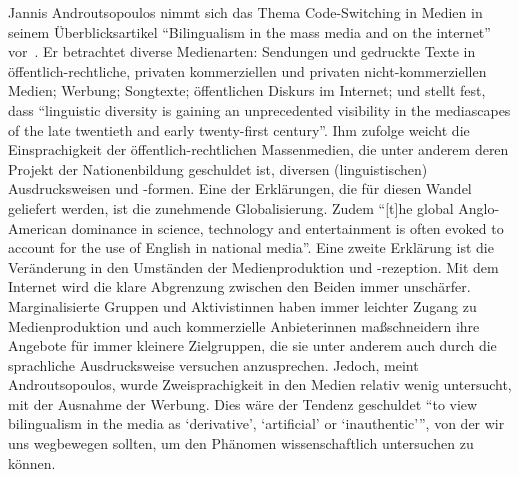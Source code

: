 Jannis Androutsopoulos nimmt sich das Thema Code-Switching in Medien in seinem Überblicksartikel ``Bilingualism in the mass media and on the internet'' vor~\cite[]{Andr07}.
Er betrachtet diverse Medienarten: Sendungen und gedruckte Texte in öffentlich-rechtliche, privaten kommerziellen und privaten nicht-kommerziellen Medien; Werbung; Songtexte; öffentlichen Diskurs im Internet;
und stellt fest, dass ``linguistic diversity is gaining an unprecedented visibility in the mediascapes of the late twentieth and early twenty-first century''.
Ihm zufolge weicht die Einsprachigkeit der öffentlich-rechtlichen Massenmedien, die unter anderem deren Projekt der Nationenbildung geschuldet ist, diversen (linguistischen) Ausdrucksweisen und -formen.
Eine der Erklärungen, die für diesen Wandel geliefert werden, ist die zunehmende Globalisierung.
Zudem ``[t]he global Anglo-American dominance in science, technology and entertainment is often evoked to account for the use of English in national media''.
Eine zweite Erklärung ist die Veränderung in den Umständen der Medienproduktion und -rezeption.
Mit dem Internet wird die klare Abgrenzung zwischen den Beiden immer unschärfer.
Marginalisierte Gruppen und Aktivistinnen haben immer leichter Zugang zu Medienproduktion und auch kommerzielle Anbieterinnen maßschneidern ihre Angebote für immer kleinere Zielgruppen, die sie unter anderem auch durch die sprachliche Ausdrucksweise versuchen anzusprechen.
Jedoch, meint Androutsopoulos, wurde Zweisprachigkeit in den Medien relativ wenig untersucht, mit der Ausnahme der Werbung.
Dies wäre der Tendenz geschuldet ``to view bilingualism in the media as ‘derivative’, ‘artificial’ or ‘inauthentic’'', %
von der wir uns wegbewegen sollten, um den Phänomen wissenschaftlich untersuchen zu können.



